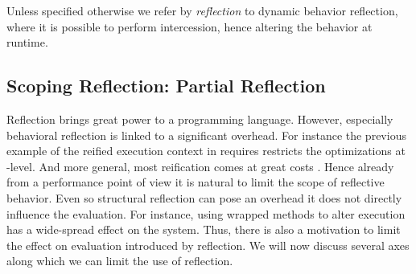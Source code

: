 \noindent Unless specified otherwise we refer by \emph{reflection} to dynamic behavior reflection, where it is possible to perform intercession, hence altering the behavior at runtime.

\subsection{Scoping Reflection: Partial Reflection}
Reflection brings great power to a programming language.
However, especially behavioral reflection is linked to a significant overhead.
For instance the previous example of the reified execution context in \ST requires restricts the optimizations at \VM-level.
And more general, most reification comes at great costs \cite{Male96a}.
Hence already from a performance point of view it is natural to limit the scope of reflective behavior.
Even so structural reflection can pose an overhead it does not directly influence the evaluation.
For instance, using wrapped methods to alter execution has a wide-spread effect on the system.
Thus, there is also a motivation to limit the effect on evaluation introduced by reflection.
We will now discuss several axes along which we can limit the use of reflection.
%

